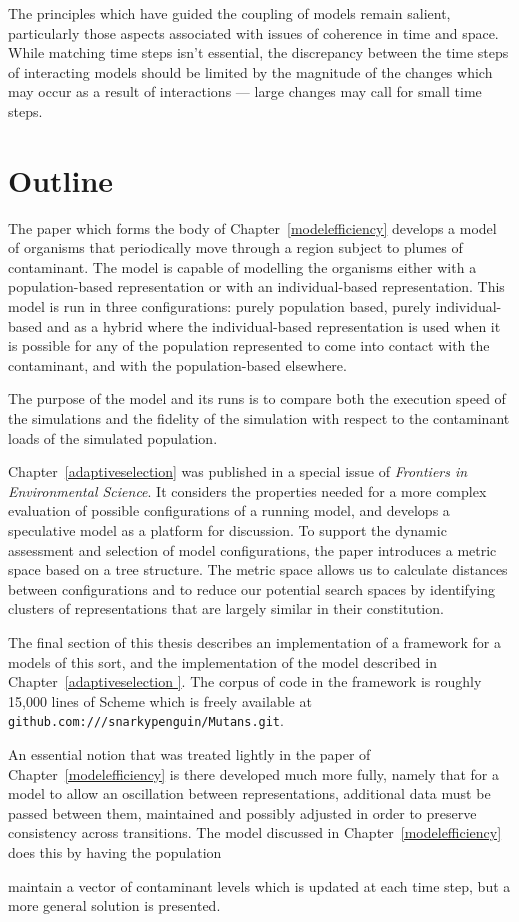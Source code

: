 The principles which have guided the coupling of models remain
salient, particularly those aspects associated with issues of
coherence in time and space. While matching time steps isn't essential,
the discrepancy between the time steps of interacting models should be
limited by the magnitude of the changes which may occur as a result of
interactions --- large changes may call for small time steps.

\section{Outline}
The paper which forms the body of Chapter~\ref{modelefficiency}
develops a model of organisms that periodically move through a region
subject to plumes of contaminant.  The model is capable of
modelling the organisms either with a population-based representation
or with an individual-based representation.  This model is run in
three configurations: purely population based, purely individual-based
and as a hybrid where the individual-based representation is used when
it is possible for any of the population represented to come into
contact with the contaminant, and with the  population-based
elsewhere.

The purpose of the model and its runs is to compare both the execution
speed of the simulations and the fidelity of the simulation with
respect to the contaminant loads of the simulated population.

Chapter~\ref{adaptiveselection} was published in a special issue
of \emph{Frontiers in Environmental Science\/}. It considers the 
properties needed for a more complex evaluation of possible
configurations of a running model, and develops a speculative model as
a platform for discussion.  To support the dynamic assessment and
selection of model configurations, the paper introduces a metric space
based on a tree structure. The metric space allows us to calculate
distances between configurations and to reduce our potential search
spaces by identifying clusters of representations that are largely
similar in their constitution.

The final section of this thesis describes an implementation of a
framework for a models of this sort, and the implementation of the
model described in Chapter~\ref{adaptiveselection }. The corpus of
code in the framework is roughly 15,000 lines of Scheme which is
freely available at \texttt{github.com:///snarkypenguin/Mutans.git}.

An essential notion that was treated lightly in the paper of
Chapter~\ref{modelefficiency} is there developed much more fully,
namely that for a model to allow an oscillation between
representations, additional data must be passed between them,
maintained and possibly adjusted in order to preserve consistency
across transitions.  The model discussed in
Chapter~\ref{modelefficiency} does this by having the population

maintain a vector of contaminant levels which is updated at each time
step, but a more general solution is presented.


